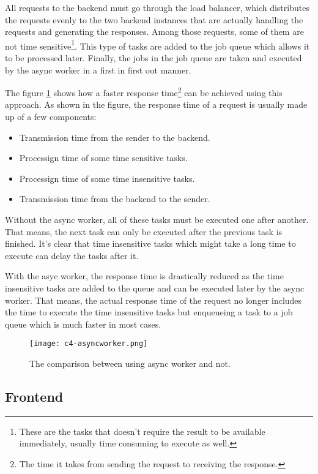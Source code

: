 \documentclass[../thesis.tex]{subfiles}
\begin{document}
All requests to the backend must go through the load balancer, which distributes the requests evenly to the two backend instances that are actually handling the requests and generating the responses. Among those requests, some of them are not time sensitive\footnote{These are the tasks that doesn't require the result to be available immediately, usually time consuming to execute as well.}. This type of tasks are added to the job queue which allows it to be processed later. Finally, the jobs in the job queue are taken and executed by the async worker in a first in first out manner. 

The figure \ref{fig:asyncworker} shows how a faster response time\footnote{The time it takes from sending the request to receiving the response.} can be achieved using this approach. As shown in the figure, the response time of a request is usually made up of a few components:

\begin{itemize}
	\item Transmission time from the sender to the backend.
	\item Processign time of some time sensitive tasks.
	\item Processign time of some time insensitive tasks.
	\item Transmission time from the backend to the sender.
\end{itemize}

Without the async worker, all of these tasks must be executed one after another. That means, the next task can only be executed after the previous task is finished. It's clear that time insensitive tasks which might take a long time to execute can delay the tasks after it. 

With the asyc worker, the response time is drastically reduced as the time insensitive tasks are added to the queue and can be executed later by the async worker. That means, the actual response time of the request no longer includes the time to execute the time insensitive tasks but enqueueing a task to a job queue which is much faster in most cases. 

\begin{figure}[!ht]
	\centering
	\texttt{[image: c4-asyncworker.png]}
	\caption{The comparison between using async worker and not.}
	\label{fig:asyncworker}
\end{figure}


\subsection{Frontend}
\label{sec:frontend}
\end{document}
